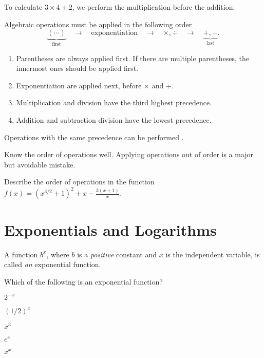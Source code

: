 \documentclass[../main.tex]{subfiles}
\begin{document}
\begin{example}
  To calculate \(3 \times 4 + 2\), we perform the multiplication before the addition. 
  
\end{example}

\begin{mdframed}[style=simple-compact]
  Algebraic operations must be applied in the following order
  \[ \underbrace{( \cdots )}_{\text{first}} \quad\longrightarrow\quad \text{exponentiation} \quad\longrightarrow\quad \times, \div \quad\longrightarrow\quad \underbrace{+, -}_{\text{last}}. \]

  \begin{enumerate}[itemsep=0pt]
    \item Parentheses are always applied first. If there are multiple parentheses, the innermost ones should be applied first.
    \item Exponentiation are applied next, before \(\times\) and \(\div\).
    \item Multiplication and division have the third highest precedence.
    \item Addition and subtraction division have the lowest precedence.
  \end{enumerate}

  Operations with the same precedence can be performed .
\end{mdframed}

Know the order of operations well. Applying operations out of order is a major but avoidable mistake.

\begin{example}
  Describe the order of operations in the function \( f(x) = (x^{3/2}+1)^{2} + x - \frac{3 (x + 1)}{x}\).  
\end{example}

\section{Exponentials and Logarithms}

A function \(b^{x}\), where \(b\) is a \emph{positive} constant and \(x\) is the independent variable, is called \emph{an} exponential function. 
\begin{example}
  Which of the following is an exponential function?

  \begin{enumerate*}
    \item \(2^{-x}\)
    \item \((1/2)^{x}\)
    \item \(x^{3}\)
    \item \(e^{x}\)
    \item \(x^{x}\)
  \end{enumerate*}
\end{example}
\end{document}
